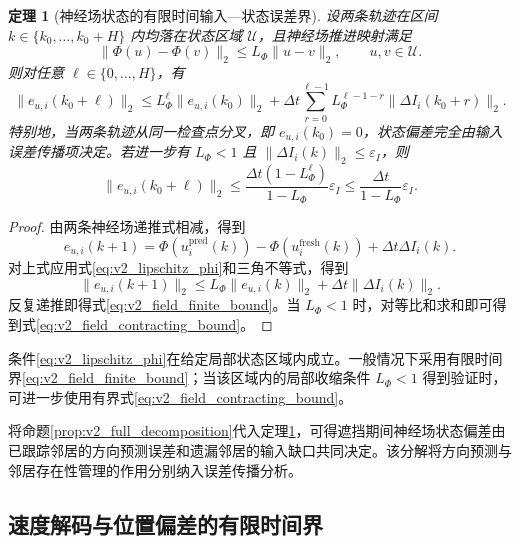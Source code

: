 \documentclass[UTF8,fontset=windows,11pt]{ctexart}
\newtheorem{theorem}{定理}[section]
\begin{document}
\begin{theorem}[神经场状态的有限时间输入—状态误差界]
\label{thm:v2_field_bound}
设两条轨迹在区间 $k\in\{k_0,\ldots,k_0+H\}$ 内均落在状态区域 $\mathcal U$，且神经场推进映射满足
\begin{equation}
 \|\Phi(u)-\Phi(v)\|_2\le L_\Phi\|u-v\|_2,
 \qquad u,v\in\mathcal U.
 \label{eq:v2_lipschitz_phi}
\end{equation}
则对任意 $\ell\in\{0,\ldots,H\}$，有
\begin{equation}
 \|e_{u,i}(k_0+\ell)\|_2
 \le L_\Phi^\ell\|e_{u,i}(k_0)\|_2
 +\Delta t\sum_{r=0}^{\ell-1}
 L_\Phi^{\ell-1-r}\|\Delta I_i(k_0+r)\|_2.
 \label{eq:v2_field_finite_bound}
\end{equation}
特别地，当两条轨迹从同一检查点分叉，即 $e_{u,i}(k_0)=0$，状态偏差完全由输入误差传播项决定。若进一步有 $L_\Phi<1$ 且 $\|\Delta I_i(k)\|_2\le\varepsilon_I$，则
\begin{equation}
 \|e_{u,i}(k_0+\ell)\|_2
 \le
 \frac{\Delta t(1-L_\Phi^\ell)}{1-L_\Phi}\varepsilon_I
 \le\frac{\Delta t}{1-L_\Phi}\varepsilon_I.
 \label{eq:v2_field_contracting_bound}
\end{equation}
\end{theorem}

\begin{proof}
由两条神经场递推式相减，得到
\begin{equation}
 e_{u,i}(k+1)=\Phi(u_i^{\mathrm{pred}}(k))-
 \Phi(u_i^{\mathrm{fresh}}(k))+\Delta t\Delta I_i(k).
 \end{equation}
对上式应用式\eqref{eq:v2_lipschitz_phi}和三角不等式，得到
\begin{equation}
 \|e_{u,i}(k+1)\|_2
 \le L_\Phi\|e_{u,i}(k)\|_2+\Delta t\|\Delta I_i(k)\|_2.
\end{equation}
反复递推即得式\eqref{eq:v2_field_finite_bound}。当 $L_\Phi<1$ 时，对等比和求和即可得到式\eqref{eq:v2_field_contracting_bound}。
\end{proof}

条件\eqref{eq:v2_lipschitz_phi}在给定局部状态区域内成立。一般情况下采用有限时间界\eqref{eq:v2_field_finite_bound}；当该区域内的局部收缩条件 $L_\Phi<1$ 得到验证时，可进一步使用有界式\eqref{eq:v2_field_contracting_bound}。

将命题\ref{prop:v2_full_decomposition}代入定理\ref{thm:v2_field_bound}，可得遮挡期间神经场状态偏差由已跟踪邻居的方向预测误差和遗漏邻居的输入缺口共同决定。该分解将方向预测与邻居存在性管理的作用分别纳入误差传播分析。

\subsection{速度解码与位置偏差的有限时间界}
\end{document}

